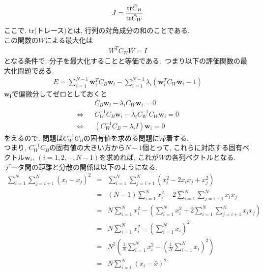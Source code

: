 \documentclass[dvipdfmx,a4j]{jsarticle}
\begin{document}
  \begin{eqnarray*}
    J=\frac{{\rm tr}\tilde{C}_{B}}{{\rm tr}\tilde{C}_{W}}
  \end{eqnarray*}
  ここで, tr(トレース)とは, 行列の対角成分の和のことである.\\
  この関数の$W$による最大化は
  \begin{eqnarray*}
    W^{T}C_{W}W=I
  \end{eqnarray*}
  となる条件で, 分子を最大化することと等価である.\ つまり以下の評価関数の最大化問題である.
  \begin{eqnarray*}
    E=\sum_{i=1}^{N-1}\bm{w}_{i}^{T}C_{B}\bm{w}_{i}-\sum_{i=1}^{N-1}\lambda_{i}(\bm{w}_{i}^{T}C_{W}\bm{w}_{i}-1)
  \end{eqnarray*}
  $\bm{w_{i}}$で偏微分してゼロとしておくと
  \begin{eqnarray*}
    &&C_{B}\bm{w}_{i}-\lambda_{i}C_{W}\bm{w}_{i}=0\\
    \Longleftrightarrow && C_{W}^{-1}C_{B}\bm{w}_{i}-\lambda_{i}C_{W}^{-1}C_{W}\bm{w}_{i}=0\\
    \Longleftrightarrow && (C_{W}^{-1}C_{B}-\lambda_{i}I)\bm{w}_{i}=0
  \end{eqnarray*}
  をえるので, 問題は$C_{W}^{-1}C_{B}$の固有値を求める問題に帰着する.\\
  つまり, $C_{W}^{-1}C_{B}$の固有値の大きい方から$N-1$個とって, これらに対応する固有ベクトル$\bm{w}_{i},\ (i=1,2,\cdots,N-1)$を求めれば, これが$W$の各列ベクトルとなる.\\
  データ間の距離と分散の関係は以下のようになる.
  \begin{eqnarray*}
    \sum_{i=1}^{N}\sum_{j=i+1}^{N}(x_{i}-x_{j})^{2}&=& \sum_{i=1}^{N}\sum_{j=i+1}^{N}(x_{i}^{2}-2x_{i}x_{j}+x_{j}^{2})\\
                                                   &=& (N-1)\sum_{i=1}^{N}x_{i}^{2}-2\sum_{i=1}^{N}\sum_{j=i+1}^{N}x_{i}x_{j}\\
                                                   &=& N\sum_{i=1}^{N}x_{i}^{2}-\left(\sum_{i=1}^{N}x_{i}^{2}+2\sum_{i=1}^{N}\sum_{j=i+1}^{N}x_{i}x_{j}\right)\\
                                                   &=& N\sum_{i=1}^{N}x_{i}^{2}-\left(\sum_{i=1}^{N}x_{i}\right)^{2}\\
                                                   &=& N^{2}\left(\frac{1}{N}\sum_{i=1}^{N}x_{i}^{2}-\left(\frac{1}{N}\sum_{i=1}^{N}x_{i}\right)^{2}\right)\\
                                                   &=& N\sum_{i=1}^{N}(x_{i}-\bar{x})^{2}
  \end{eqnarray*}
\end{document}

